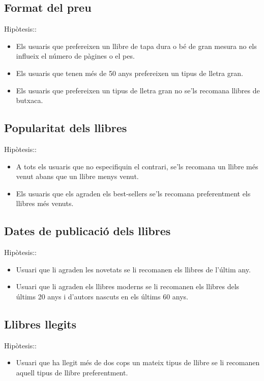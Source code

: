 \subsection{Format del preu}
Hipòtesis::
\begin{itemize}
  \item Els usuaris que prefereixen un llibre de tapa dura o bé de gran mesura no els influeix el número de pàgines o el pes.
  \item Els usuaris que tenen més de 50 anys prefereixen un tipus de lletra gran.
  \item Els usuaris que prefereixen un tipus de lletra gran no se'ls recomana llibres de butxaca.
\end{itemize}

\subsection{Popularitat dels llibres}
Hipòtesis::
\begin{itemize}
  \item A tots els usuaris que no especifiquin el contrari, se'ls recomana un llibre més venut abans que un llibre menys venut.
  \item Els usuaris que els agraden els best-sellers se'ls recomana preferentment els llibres més venuts.
\end{itemize}

\subsection{Dates de publicació dels llibres}
Hipòtesis::
\begin{itemize}
  \item Usuari que li agraden les novetats se li recomanen els llibres de l'últim any.
  \item Usuari que li agraden els llibres moderns se li recomanen els llibres dels  últims 20 anys i d'autors nascuts en els últims 60 anys.
\end{itemize}

\subsection{Llibres llegits}
Hipòtesis::
\begin{itemize}
  \item Usuari que ha llegit més de dos cops un mateix tipus de llibre se li recomanen aquell tipus de llibre preferentment.
\end{itemize}




